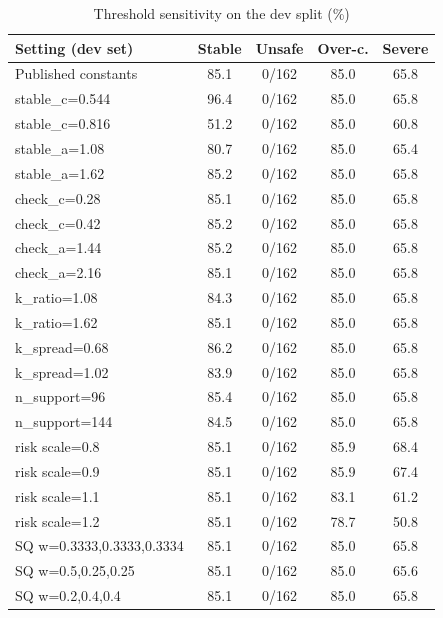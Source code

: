 \begin{table}[t]
\centering
\caption{Threshold sensitivity on the dev split (\%)}
\label{tab:sensitivity}
\footnotesize
\setlength{\tabcolsep}{3pt}
\begin{tabular}{lcccc}
\hline
Setting (dev set) & Stable & Unsafe & Over-c. & Severe \\
\hline
Published constants & 85.1 & 0/162 & 85.0 & 65.8 \\
stable\_c=0.544 & 96.4 & 0/162 & 85.0 & 65.8 \\
stable\_c=0.816 & 51.2 & 0/162 & 85.0 & 60.8 \\
stable\_a=1.08 & 80.7 & 0/162 & 85.0 & 65.4 \\
stable\_a=1.62 & 85.2 & 0/162 & 85.0 & 65.8 \\
check\_c=0.28 & 85.1 & 0/162 & 85.0 & 65.8 \\
check\_c=0.42 & 85.2 & 0/162 & 85.0 & 65.8 \\
check\_a=1.44 & 85.2 & 0/162 & 85.0 & 65.8 \\
check\_a=2.16 & 85.1 & 0/162 & 85.0 & 65.8 \\
k\_ratio=1.08 & 84.3 & 0/162 & 85.0 & 65.8 \\
k\_ratio=1.62 & 85.1 & 0/162 & 85.0 & 65.8 \\
k\_spread=0.68 & 86.2 & 0/162 & 85.0 & 65.8 \\
k\_spread=1.02 & 83.9 & 0/162 & 85.0 & 65.8 \\
n\_support=96 & 85.4 & 0/162 & 85.0 & 65.8 \\
n\_support=144 & 84.5 & 0/162 & 85.0 & 65.8 \\
risk scale=0.8 & 85.1 & 0/162 & 85.9 & 68.4 \\
risk scale=0.9 & 85.1 & 0/162 & 85.9 & 67.4 \\
risk scale=1.1 & 85.1 & 0/162 & 83.1 & 61.2 \\
risk scale=1.2 & 85.1 & 0/162 & 78.7 & 50.8 \\
SQ w=0.3333,0.3333,0.3334 & 85.1 & 0/162 & 85.0 & 65.8 \\
SQ w=0.5,0.25,0.25 & 85.1 & 0/162 & 85.0 & 65.6 \\
SQ w=0.2,0.4,0.4 & 85.1 & 0/162 & 85.0 & 65.8 \\
\hline
\end{tabular}
\end{table}
